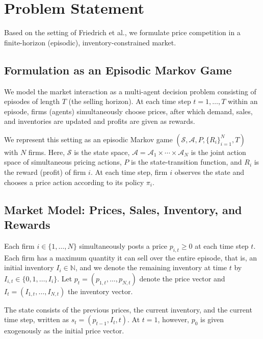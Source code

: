 \documentclass[runningheads]{llncs}
\begin{document}
\section{Problem Statement}
\label{sec:problem_statement}

Based on the setting of Friedrich et al.\cite{friedrich2025learning}, we formulate price competition in a finite-horizon (episodic), inventory-constrained market.

\subsection{Formulation as an Episodic Markov Game}
We model the market interaction as a multi-agent decision problem consisting of episodes of length $T$ (the selling horizon).
At each time step $t=1,\dots,T$ within an episode, firms (agents) simultaneously choose prices, after which demand, sales, and inventories are updated and profits are given as rewards.

We represent this setting as an episodic Markov game
$(\mathcal{S}, \mathcal{A}, P, \{R_i\}_{i=1}^N, T)$
with $N$ firms.
Here, $\mathcal{S}$ is the state space, $\mathcal{A}=\mathcal{A}_1\times\cdots\times\mathcal{A}_N$ is the joint action space of simultaneous pricing actions, $P$ is the state-transition function, and $R_i$ is the reward (profit) of firm $i$.
At each time step, firm $i$ observes the state and chooses a price action according to its policy $\pi_i$.

\subsection{Market Model: Prices, Sales, Inventory, and Rewards}
Each firm $i\in\{1,\dots,N\}$ simultaneously posts a price $p_{i,t}\ge 0$ at each time step $t$.
Each firm has a maximum quantity it can sell over the entire episode, that is, an initial inventory $I_i\in\mathbb{N}$, and we denote the remaining inventory at time $t$ by $I_{i,t}\in\{0,1,\dots,I_i\}$.
Let $p_t=(p_{1,t},\dots,p_{N,t})$ denote the price vector and $I_t=(I_{1,t},\dots,I_{N,t})$ the inventory vector.

The state consists of the previous prices, the current inventory, and the current time step, written as $s_t = (p_{t-1}, I_t, t)$.
At $t=1$, however, $p_0$ is given exogenously as the initial price vector.
\end{document}
